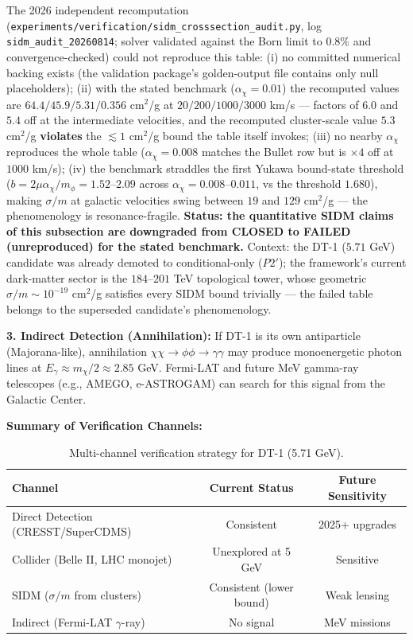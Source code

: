 \documentclass[a4paper,12pt]{article}
\begin{document}
\begin{mdframed}[backgroundcolor=yellow!8, frametitle={2026 audit: Table~\ref{tab:sidm_v12} not reproduced --- status downgraded}]
The 2026 independent recomputation
(\texttt{experiments/\allowbreak verification/\allowbreak sidm\_\allowbreak crosssection\_\allowbreak audit.py}, log
\texttt{sidm\_audit\_20260814}; solver validated against the Born limit to $0.8\%$ and
convergence-checked) could not reproduce this table: (i) no committed numerical backing
exists (the validation package's golden-output file contains only null placeholders);
(ii) with the stated benchmark ($\alpha_\chi = 0.01$) the recomputed values are
$64.4 / 45.9 / 5.31 / 0.356$ cm$^2$/g at $20/200/1000/3000$ km/s --- factors of
$6.0$ and $5.4$ off at the intermediate velocities, and the recomputed cluster-scale
value $5.3$ cm$^2$/g \textbf{violates} the $\lesssim 1$ cm$^2$/g bound the table itself
invokes; (iii) no nearby $\alpha_\chi$ reproduces the whole table
($\alpha_\chi = 0.008$ matches the Bullet row but is $\times4$ off at $1000$ km/s);
(iv) the benchmark straddles the first Yukawa bound-state threshold
($b = 2\mu\alpha_\chi/m_\phi = 1.52$--$2.09$ across $\alpha_\chi = 0.008$--$0.011$, vs
the threshold $1.680$), making $\sigma/m$ at galactic velocities swing between $19$ and
$129$ cm$^2$/g --- the phenomenology is resonance-fragile. \textbf{Status: the
quantitative SIDM claims of this subsection are downgraded from CLOSED to FAILED
(unreproduced) for the stated benchmark.} Context: the DT-1 ($5.71$ GeV) candidate was
already demoted to conditional-only ($P2'$); the framework's current dark-matter sector
is the $184$--$201$ TeV topological tower, whose geometric $\sigma/m \sim 10^{-19}$
cm$^2$/g satisfies every SIDM bound trivially --- the failed table belongs to the
superseded candidate's phenomenology.
\end{mdframed}




\textbf{3. Indirect Detection (Annihilation):}
If DT-1 is its own antiparticle (Majorana-like), annihilation $\chi\chi \to \phi\phi \to \gamma\gamma$ may produce monoenergetic photon lines at $E_\gamma \approx m_\chi / 2 \approx 2.85$ GeV. Fermi-LAT and future MeV gamma-ray telescopes (e.g., AMEGO, e-ASTROGAM) can search for this signal from the Galactic Center.

\textbf{Summary of Verification Channels:}
\begin{table}[H]
\centering
\small
\begin{tabular}{lcc}
\toprule
\textbf{Channel} & \textbf{Current Status} & \textbf{Future Sensitivity} \\
\midrule
Direct Detection (CRESST/SuperCDMS) & Consistent & 2025+ upgrades \\
Collider (Belle II, LHC monojet) & Unexplored at 5 GeV & Sensitive \\
SIDM ($\sigma/m$ from clusters) & Consistent (lower bound) & Weak lensing \\
Indirect (Fermi-LAT $\gamma$-ray) & No signal & MeV missions \\
\bottomrule
\end{tabular}
\caption{Multi-channel verification strategy for DT-1 (5.71 GeV).}
\end{table}
\end{document}
